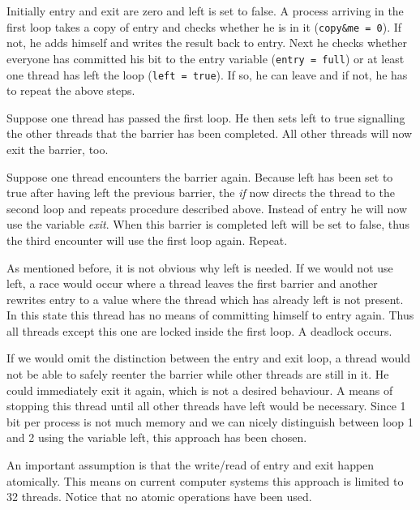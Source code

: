 \documentclass[a4paper, 10pt]{article}
\begin{document}
Initially entry and exit are zero and left is set to false. A process arriving in the first loop takes a copy of entry and checks whether he is in it (\texttt{copy\&me = 0}). If not, he adds himself and writes the result back to entry. Next he checks whether everyone has committed his bit to the entry variable (\texttt{entry = full}) or at least one thread has left the loop (\texttt{left = true}). If so, he can leave and if not, he has to repeat the above steps.

Suppose one thread has passed the first loop. He then sets left to true signalling the other threads that the barrier has been completed. All other threads will now exit the barrier, too.

Suppose one thread encounters the barrier again. Because left has been set to true after having left the previous barrier, the \emph{if} now directs the thread to the second loop and repeats procedure described above. Instead of entry he will now use the variable \emph{exit}. When this barrier is completed left will be set to false, thus the third encounter will use the first loop again. Repeat.

As mentioned before, it is not obvious why left is needed. If we would not use left, a race would occur where a thread leaves the first barrier and another rewrites entry to a value where the thread which has already left is not present. In this state this thread has no means of committing himself to entry again. Thus all threads except this one are locked inside the first loop. A deadlock occurs.

If we would omit the distinction between the entry and exit loop, a thread would not be able to safely reenter the barrier while other threads are still in it. He could immediately exit it again, which is not a desired behaviour. A means of stopping this thread until all other threads have left would be necessary. Since 1 bit per process is not much memory and we can nicely distinguish between loop 1 and 2 using the variable left, this approach has been chosen.

An important assumption is that the write/read of entry and exit happen atomically. This means on current computer systems this approach is limited to 32 threads. Notice that no atomic operations have been used.

\end{document}
